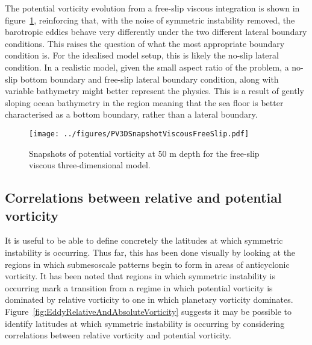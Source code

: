 The potential vorticity evolution from a free-slip viscous integration is shown in figure~\ref{fig:PV3DSnapshotViscousFreeSlip}, reinforcing that, with the noise of symmetric instability removed, the barotropic eddies behave very differently under the two different lateral boundary conditions. This raises the question of what the most appropriate boundary condition is. For the idealised model setup, this is likely the no-slip lateral condition. In a realistic model, given the small aspect ratio of the problem, a no-slip bottom boundary and free-slip lateral boundary condition, along with variable bathymetry might better represent the physics. This is a result of gently sloping ocean bathymetry in the region meaning that the sea floor is better characterised as a bottom boundary, rather than a lateral boundary.

\begin{figure} 
    \centering
    \texttt{[image: ../figures/PV3DSnapshotViscousFreeSlip.pdf]}
    \caption{Snapshots of potential vorticity at 50 m depth for the free-slip viscous three-dimensional model.}
    \label{fig:PV3DSnapshotViscousFreeSlip}
\end{figure}

\subsection{Correlations between relative and potential vorticity}
It is useful to be able to define concretely the latitudes at which symmetric instability is occurring. Thus far, this has been done visually by looking at the regions in which submesoscale patterns begin to form in areas of anticyclonic vorticity. It has been noted that regions in which symmetric instability is occurring mark a transition from a regime in which potential vorticity is dominated by relative vorticity to one in which planetary vorticity dominates. Figure~\ref{fig:EddyRelativeAndAbsoluteVorticity} suggests it may be possible to identify latitudes at which symmetric instability is occurring by considering correlations between relative vorticity and potential vorticity.

